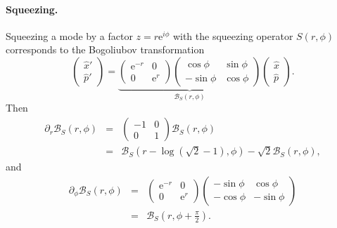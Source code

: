 \documentclass[aps,pra,10pt,twocolumn,groupedaddress,nofootinbib]{revtex4-1}
\theoremstyle{plain}
\newcommand{\x}{\hat{x}}
\newcommand{\p}{\hat{p}}
\newcommand{\e}{\mathrm{e}}
\begin{document}
\paragraph{Squeezing.}
Squeezing a mode by a factor $z = r \e^{i\phi}$ with the squeezing operator $S(r, \phi)$ corresponds to the Bogoliubov transformation
\[ \begin{pmatrix} \x'\\ \p' \end{pmatrix} = \underbrace{\begin{pmatrix} \e^{-r} & 0 \\ 0 & \e^{r} \end{pmatrix} \begin{pmatrix} \cos \phi & \sin \phi \\ - \sin \phi & \cos \phi \end{pmatrix}}_{\mathcal{B}_S(r, \phi)} \begin{pmatrix} \x \\ \p \end{pmatrix}. \]
Then
\begin{eqnarray*} \partial_{r} \mathcal{B}_S(r, \phi) &=& \begin{pmatrix} -1 & 0 \\ 0 & 1 \end{pmatrix}
\mathcal{B}_S(r, \phi) \\
&=& \mathcal{B}_S(r-\log (\sqrt{2}-1), \phi) - \sqrt{2} \mathcal{B}_S(r, \phi),\end{eqnarray*}
and
\begin{eqnarray*} \partial_{\phi} \mathcal{B}_S(r, \phi) &=& \begin{pmatrix} \e^{-r} & 0 \\ 0 & \e^{r} \end{pmatrix} \begin{pmatrix} -\sin \phi & \cos \phi \\ - \cos \phi & -\sin \phi \end{pmatrix}\\
&=& \mathcal{B}_S(r, \phi + \frac{\pi}{2}).\end{eqnarray*}
\end{document}
